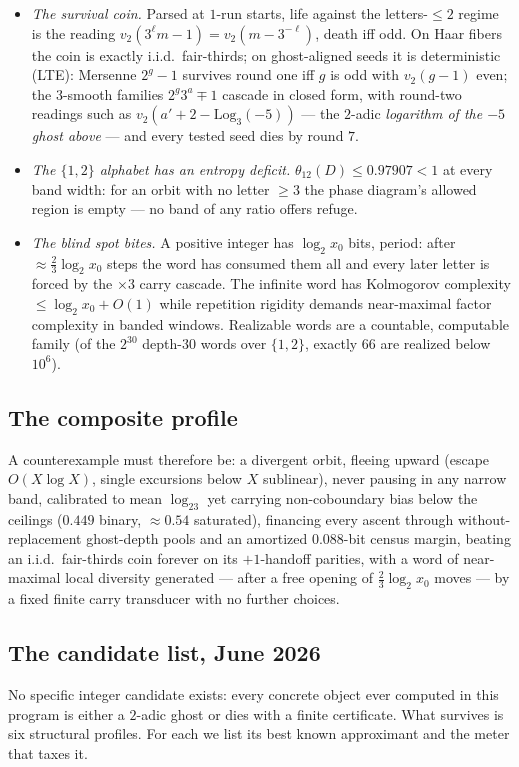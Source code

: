 \documentclass[10pt]{article}
\begin{document}
\begin{itemize}
lifetime steps below $X$.
\item \emph{The survival coin.} Parsed at $1$-run starts, life
against the letters-$\le2$ regime is the reading
$v_2(3^\ell m-1)=v_2(m-3^{-\ell})$, death iff odd. On Haar fibers the
coin is exactly i.i.d.\ fair-thirds; on ghost-aligned seeds it is
deterministic (LTE): Mersenne $2^g-1$ survives round one iff $g$ is
odd with $v_2(g-1)$ even; the $3$-smooth families $2^g3^a\mp1$ cascade
in closed form, with round-two readings such as
$v_2(a'+2-\mathrm{Log}_3(-5))$ --- the $2$-adic \emph{logarithm of the
$-5$ ghost above} --- and every tested seed dies by round $7$.
\item \emph{The $\{1,2\}$ alphabet has an entropy deficit.}
$\theta_{12}(D)\le0.97907<1$ at every band width: for an orbit with no
letter $\ge3$ the phase diagram's allowed region is empty --- no band
of any ratio offers refuge.
\item \emph{The blind spot bites.} A positive integer has
$\log_2x_0$ bits, period: after $\approx\tfrac23\log_2x_0$ steps the
word has consumed them all and every later letter is forced by the
$\times3$ carry cascade. The infinite word has Kolmogorov complexity
$\le\log_2x_0+O(1)$ while repetition rigidity demands near-maximal
factor complexity in banded windows. Realizable words are a countable,
computable family (of the $2^{30}$ depth-$30$ words over $\{1,2\}$,
exactly $66$ are realized below $10^6$).
\end{itemize}

\subsection*{The composite profile}
A counterexample must therefore be: a divergent orbit, fleeing upward
(escape $O(X\log X)$, single excursions below $X$ sublinear), never
pausing in any narrow band, calibrated to mean $\log_23$ yet carrying
non-coboundary bias below the ceilings ($0.449$ binary,
$\approx0.54$ saturated), financing every ascent through
without-replacement ghost-depth pools and an amortized $0.088$-bit
census margin, beating an i.i.d.\ fair-thirds coin forever on its
$+1$-handoff parities, with a word of near-maximal local diversity
generated --- after a free opening of $\tfrac23\log_2x_0$ moves --- by
a fixed finite carry transducer with no further choices.

\subsection*{The candidate list, June 2026}
No specific integer candidate exists: every concrete object ever
computed in this program is either a $2$-adic ghost or dies with a
finite certificate. What survives is six structural profiles. For
each we list its best known approximant and the meter that taxes it.
\end{document}
